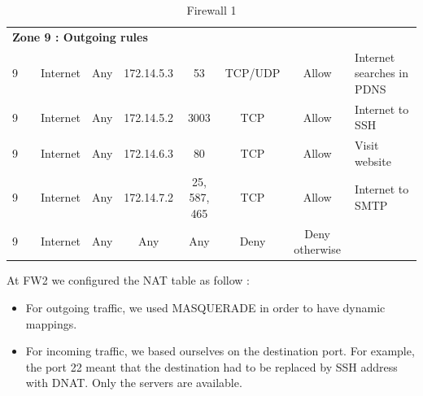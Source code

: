 \documentclass[a4paper,titlepage]{article}
\begin{document}
\begin{table}[h]
\begin{tabular}{c|c|cc|cc|ccl}
		\hline
		\multicolumn{9}{l}{\textbf{Zone 9 : Outgoing rules}}\\
		9 &  & Internet & Any & 172.14.5.3 & 53 & TCP/UDP & Allow & Internet searches in PDNS\\
		9 &  & Internet & Any & 172.14.5.2 & 3003 & TCP & Allow & Internet to SSH\\
		9 &  & Internet & Any & 172.14.6.3 & 80 & TCP & Allow & Visit website\\
		9 &  & Internet & Any & 172.14.7.2 & 25, 587, 465 & TCP & Allow & Internet to SMTP\\
		9 &  & Internet & Any & Any & Any & Deny & Deny otherwise

	\end{tabular}
	\caption{Firewall 1}
\end{table}


At FW2 we configured the NAT table as follow :
\begin{itemize}
\item For outgoing traffic, we used MASQUERADE in order to have dynamic mappings.
\item For incoming traffic, we based ourselves on the destination port. For example, the port 22 meant that the destination had to be replaced by SSH address with DNAT. Only the servers are available.
\end{itemize}
\end{document}
